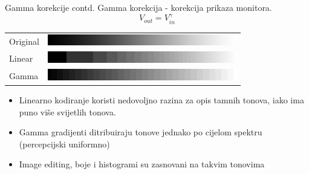 \documentclass[9pt]{beamer}
\begin{document}
\begin{frame}{Gamma korekcije contd.}
	Gamma korekcija - korekcija prikaza monitora.
	\[ V_{out} = V_{in}^{\gamma}\]
	\begin{center}
		\begin{tabular}{ll}
			Original &\includegraphics[height=0.5cm]{slike/05_gamma_gradient3b.png}\\
			Linear&  \includegraphics[height=0.5cm]{slike/05_gamma_gradient2b.png}\\
			Gamma&  \includegraphics[height=0.5cm]{slike/05_gamma_gradient1b.png}
		\end{tabular}
	\end{center}
	\begin{itemize}
		\item Linearno kodiranje koristi nedovoljno razina za opis tamnih tonova, iako ima puno više svijetlih tonova.
		\item Gamma gradijenti ditribuiraju tonove jednako po cijelom spektru (percepcijski uniformno)
		\item Image editing, boje i histogrami su zasnovani na takvim tonovima
	\end{itemize}
	
\end{frame}
\end{document}
